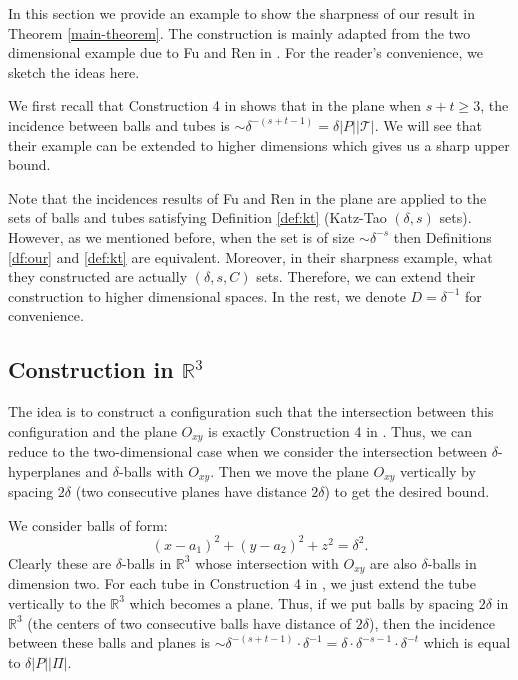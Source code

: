 \documentclass[11pt]{article}
\newcommand{\1}{\mathbf{1}}
\begin{document}
In this section we provide an example to show the sharpness of our result in Theorem \ref{main-theorem}. The construction is mainly adapted from the two dimensional example due to Fu and Ren in \cite{FuRen}. For the reader's convenience, we sketch the ideas here.

We first recall that Construction 4 in \cite{FuRen} shows that in the plane when $s + t \geq 3$, the incidence between balls and tubes is $\sim \delta^{-(s +t -1)} =\delta |P||\mathcal{T}|$. We will see that their example can be extended to higher dimensions which gives us a sharp upper bound.

Note that the incidences results of Fu and Ren \cite{FuRen} in the plane are applied to the sets of balls and tubes satisfying Definition \ref{def:kt} (Katz-Tao $(\delta, s)$ sets). However, as we mentioned before, when the set is of size $ \sim \delta^{-s}$ then Definitions \ref{df:our} and \ref{def:kt} are equivalent. Moreover, in their sharpness example, what they constructed are actually $(\delta, s, C)$ sets. Therefore, we can extend their construction to higher dimensional spaces.  In the rest, we  denote $D=\delta^{-1}$ for convenience.

\subsection{Construction in $\mathbb{R}^3$}

The idea is to construct a configuration such that the intersection between this configuration and the plane $O_{xy}$ is exactly Construction 4 in \cite{FuRen}. Thus, we can reduce to the two-dimensional case when we consider the intersection between $\delta$-hyperplanes and $\delta$-balls with $O_{xy}$.  Then we move the plane $O_{xy}$ vertically by spacing $2\delta$ (two consecutive planes have distance $2\delta$) to get the desired bound.

We consider balls of form:
\[ (x-a_1)^2 +(y-a_2)^2+z^2=\delta^2.\]
Clearly these are $\delta$-balls in $\mathbb{R}^3$ whose intersection with $O_{xy}$ are also $\delta$-balls in dimension two. For each tube in Construction 4 in \cite{FuRen}, we just extend the tube vertically to the $\mathbb{R}^3$ which becomes a plane. Thus, if we put balls by spacing $2\delta$ in $\mathbb{R}^3$ (the centers of two consecutive balls have distance of $2\delta$), then the incidence between these balls and planes is $ \sim \delta^{-(s+t -1)} \cdot \delta^{-1} = \delta \cdot \delta^{-s-1} \cdot \delta^{-t}$ which is equal to $\delta |P||\Pi|$.
\end{document}
